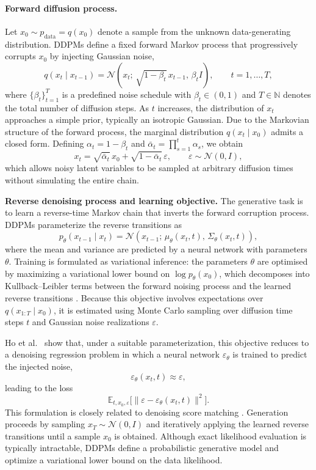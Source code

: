 \paragraph{Forward diffusion process.}
Let $x_0 \sim p_{\mathrm{data}} = q(x_0)$ denote a sample from the unknown
data-generating distribution. DDPMs define a fixed forward Markov process
\citep{norris1998markov} that progressively corrupts $x_0$ by injecting Gaussian
noise,
\[
q(x_t \mid x_{t-1}) =
\mathcal{N}\!\left(x_t;\, \sqrt{1-\beta_t}\,x_{t-1},\, \beta_t I\right),
\qquad t=1,\dots,T,
\]
where $\{\beta_t\}_{t=1}^T$ is a predefined noise schedule with $\beta_t\in(0,1)$
and $T \in \mathbb{N}$ denotes the total number of diffusion steps.
As $t$ increases, the distribution of $x_t$ approaches a simple prior, typically
an isotropic Gaussian.
Due to the Markovian structure of the forward process, the marginal distribution
$q(x_t \mid x_0)$ admits a closed form. Defining $\alpha_t = 1-\beta_t$ and
$\bar{\alpha}_t = \prod_{s=1}^t \alpha_s$, we obtain
\[
x_t = \sqrt{\bar{\alpha}_t}\,x_0
      + \sqrt{1-\bar{\alpha}_t}\,\varepsilon,
\qquad \varepsilon \sim \mathcal{N}(0,I),
\]
which allows noisy latent variables to be sampled at arbitrary diffusion times
without simulating the entire chain.

\textbf{Reverse denoising process and learning objective.}
The generative task is to learn a reverse-time Markov chain that inverts the
forward corruption process. DDPMs parameterize the reverse transitions as
\[
p_\theta(x_{t-1} \mid x_t)
=
\mathcal{N}\!\left(x_{t-1};\, \mu_\theta(x_t,t),\, \Sigma_\theta(x_t,t)\right),
\]
where the mean and variance are predicted by a neural network with parameters
$\theta$.
Training is formulated as variational inference: the parameters $\theta$ are
optimised by maximizing a variational lower bound on $\log p_\theta(x_0)$, which
decomposes into Kullback--Leibler terms between the forward noising process and
the learned reverse transitions \citep{ho2020ddpm,kullback1951information}.
Because this objective involves expectations over $q(x_{1:T}\mid x_0)$, it is
estimated using Monte Carlo sampling \citep{robert2004montecarlo} over diffusion
time steps $t$ and Gaussian noise realizations $\varepsilon$.

Ho et al.~\citep{ho2020ddpm} show that, under a suitable parameterization, this
objective reduces to a denoising regression problem in which a neural network
$\varepsilon_\theta$ is trained to predict the injected noise,
\[
\varepsilon_\theta(x_t,t) \approx \varepsilon,
\]
leading to the loss
\[
\mathbb{E}_{t,x_0,\varepsilon}
\bigl[
\|\varepsilon - \varepsilon_\theta(x_t,t)\|^2
\bigr].
\]
This formulation is closely related to denoising score matching
\citep{yang2023diffusion_survey}.
Generation proceeds by sampling $x_T \sim \mathcal{N}(0,I)$ and iteratively
applying the learned reverse transitions until a sample $x_0$ is obtained.
Although exact likelihood evaluation is typically intractable, DDPMs define a
probabilistic generative model and optimize a variational lower bound on the
data likelihood.


